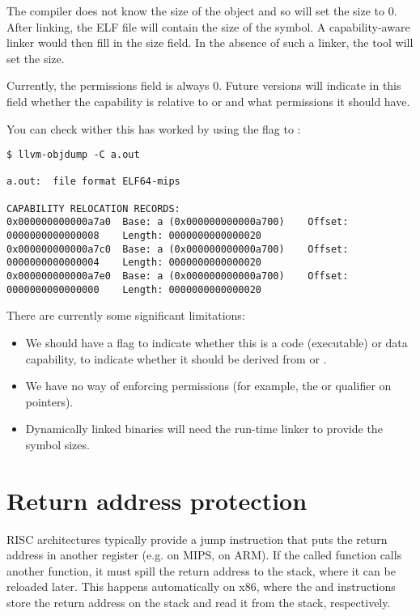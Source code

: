 The compiler does not know the size of the object and so will set the size to 0.
After linking, the ELF file will contain the size of the symbol.
A capability-aware linker would then fill in the size field.
In the absence of such a linker, the  tool will set the size.

Currently, the permissions field is always 0.
Future versions will indicate in this field whether the capability is relative to  or  and what permissions it should have.

You can check wither this has worked by using the  flag to :

\begin{verbatim}
$ llvm-objdump -C a.out

a.out:	file format ELF64-mips

CAPABILITY RELOCATION RECORDS:
0x000000000000a7a0	Base: a (0x000000000000a700)	Offset: 0000000000000008	Length: 0000000000000020
0x000000000000a7c0	Base: a (0x000000000000a700)	Offset: 0000000000000004	Length: 0000000000000020
0x000000000000a7e0	Base: a (0x000000000000a700)	Offset: 0000000000000000	Length: 0000000000000020
\end{verbatim}

There are currently some significant limitations:

\begin{itemize}
	\item We should have a flag to indicate whether this is a code (executable) or data capability, to indicate whether it should be derived from  or .
	\item We have no way of enforcing permissions (for example, the  or  qualifier on pointers).
	\item Dynamically linked binaries will need the run-time linker to provide the symbol sizes.
\end{itemize}

\section{Return address protection}

RISC architectures typically provide a jump instruction that puts the return address in another register (e.g.  on MIPS,  on ARM).
If the called function calls another function, it must spill the return address to the stack, where it can be reloaded later.
This happens automatically on x86, where the  and  instructions store the return address on the stack and read it from the stack, respectively.

